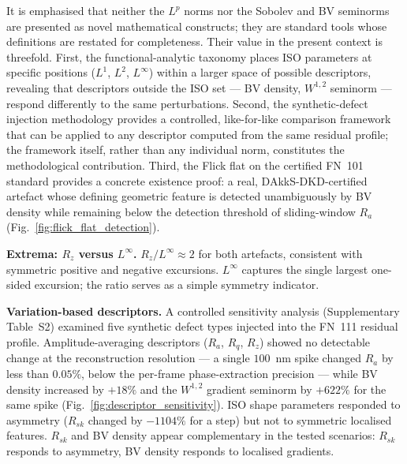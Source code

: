 \documentclass[review]{elsarticle}
\begin{document}
It is emphasised that neither the $L^p$ norms nor the Sobolev and BV seminorms are presented as novel mathematical constructs; they are standard tools whose definitions are restated for completeness. Their value in the present context is threefold. First, the functional-analytic taxonomy places ISO parameters at specific positions ($L^1$, $L^2$, $L^\infty$) within a larger space of possible descriptors, revealing that descriptors outside the ISO set — BV density, $W^{1,2}$ seminorm — respond differently to the same perturbations. Second, the synthetic-defect injection methodology provides a controlled, like-for-like comparison framework that can be applied to any descriptor computed from the same residual profile; the framework itself, rather than any individual norm, constitutes the methodological contribution. Third, the Flick flat on the certified FN~101 standard provides a concrete existence proof: a real, DAkkS-DKD-certified artefact whose defining geometric feature is detected unambiguously by BV density while remaining below the detection threshold of sliding-window $R_a$ (Fig.~\ref{fig:flick_flat_detection}).

\textbf{Extrema: $R_z$ versus $L^\infty$.} $R_z/L^\infty \approx 2$ for both artefacts, consistent with symmetric positive and negative excursions. $L^\infty$ captures the single largest one-sided excursion; the ratio serves as a simple symmetry indicator.

\textbf{Variation-based descriptors.} A controlled sensitivity analysis (Supplementary Table~S2) examined five synthetic defect types injected into the FN~111 residual profile. Amplitude-averaging descriptors ($R_a$, $R_q$, $R_z$) showed no detectable change at the reconstruction resolution — a single $100$~nm spike changed $R_a$ by less than $0.05\%$, below the per-frame phase-extraction precision — while BV density increased by $+18\%$ and the $W^{1,2}$ gradient seminorm by $+622\%$ for the same spike (Fig.~\ref{fig:descriptor_sensitivity}). ISO shape parameters responded to asymmetry ($R_{sk}$ changed by $-1104\%$ for a step) but not to symmetric localised features. $R_{sk}$ and BV density appear complementary in the tested scenarios: $R_{sk}$ responds to asymmetry, BV density responds to localised gradients.
\end{document}
